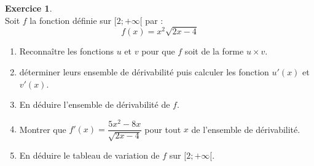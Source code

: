 \documentclass[twocolumn,10pt]{article}
\theoremstyle{definition}
\theoremstyle{definition}
\theoremstyle{definition}
\theoremstyle{definition}
\theoremstyle{definition}
\theoremstyle{definition}
\theoremstyle{definition}
\newtheorem{exercice}{Exercice}
\theoremstyle{definition}
\theoremstyle{definition}
\theoremstyle{definition}
\theoremstyle{definition}
\theoremstyle{definition}
\theoremstyle{definition}
\theoremstyle{definition}
\theoremstyle{definition}
\theoremstyle{definition}
\theoremstyle{definition}
\theoremstyle{definition}
\begin{document}
\begin{exercice}~\\
Soit $f$ la fonction définie sur $[2;+\infty[$ par : $$f(x)=x^2\sqrt{2x-4}$$
\begin{enumerate}
\item Reconnaître les fonctions $u$ et $v$ pour que $f$ soit de la forme $u\times v$. 
\item déterminer leurs ensemble de dérivabilité puis calculer les fonction $u'(x)$ et $v'(x)$. 
\item En déduire l'ensemble de dérivabilité de $f$. 
\item Montrer que $f'(x)=\dfrac{5x^2-8x}{\sqrt{2x-4}}$ pour tout $x$ de l'ensemble de dérivabilité. 
\item En déduire le tableau de variation de $f$ sur $[2;+\infty[$.
\end{enumerate}
\end{exercice}
\end{document}
